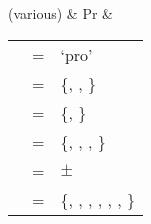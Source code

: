 	\begin{tabu} {}
	(various)
		& Pr
		& \begin{tabular}[t]{l c l}
			\ups{\Pred} & = & `pro' \\
			\ups{\Pers} & = & \{\First{}, \Second{}, \Third{}\} \\
			\ups{\Num} & = & \{\Sg{}, \Pl{}\} \\
			\ups{\Gend} & = & \{\M{}, \F{}, \N{}, \nul{}\} \\
			\ups{\Anim} & = & $\pm$ \\
			\ups{\Case} & = & \{\Aarg{}, \Parg{}, \Dat{}, \Gen{}, 
				\Loc{}, \Ins{}, \Caus{}\} \\
		\end{tabular}
	\end{tabu}
\xe

%
%
%
%
